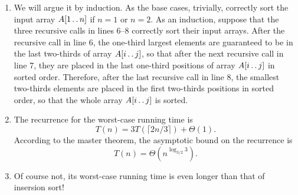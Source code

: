 \documentclass[a4paper, fleqn]{article}
\begin{document}
\begin{enumerate}
\renewcommand{\labelenumi}{\itshape \bfseries \alph{enumi}.}

\item  %

We will argue it by induction. As the base cases, trivially,  
correctly sort the input array $A[1 \mathinner{\ldotp\ldotp} n]$ if $n = 1$ or $n = 2$. As an 
induction, suppose that the three recursive calls in lines 6--8 correctly sort 
their input arrays. After the recursive call in line 6, the one-third largest 
elements are guaranteed to be in the last two-thirds of array $A[i \mathinner{\ldotp\ldotp} j]$, 
so that after the next recursive call in line 7, they are placed in the last 
one-third positions of array $A[i \mathinner{\ldotp\ldotp} j]$ in sorted order. Therefore, after 
the last recursive call in line 8, the smallest two-thirds elements are placed 
in the first two-thirds positions in sorted order, so that the whole array 
$A[i \mathinner{\ldotp\ldotp} j]$ is sorted.




\item  %

The recurrence for the worst-case running time is
\[
T(n) = 3T(\lceil 2n / 3 \rceil) + \Theta(1).
\]
According to the master theorem, the asymptotic bound on the recurrence is
\[
T(n) = \Theta(n^{\log_{3/2}3}).
\]




\item  %

Of course not, its worst-case running time is even longer than that of insersion 
sort!

\end{enumerate}
\end{document}
